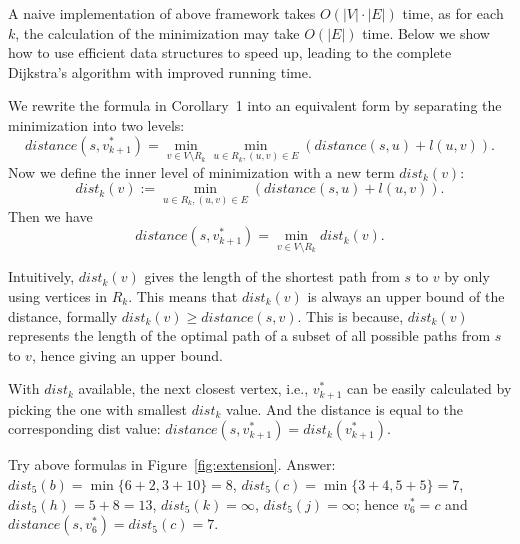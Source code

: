 \begin{algorithmblock}[0.8\textwidth]
	\xxx
	\xxx
	\xxx
	\xxx
	\xxx
	\xxx
	\xxx
\end{algorithmblock}

A naive implementation of above framework takes $O(|V|\cdot|E|)$ time,
as for each $k$, the calculation of the minimization may take $O(|E|)$ time.
Below we show how to use efficient data structures to speed up,
leading to the complete Dijkstra's algorithm with improved running time.


We rewrite the formula in Corollary~1 into an equivalent form by separating the minimization into two levels:
$$distance(s, v_{k+1}^*) = \textstyle \min_{v\in V\setminus R_k} \min_{u\in R_k, (u, v)\in E} (distance(s, u) + l(u,v)).$$
Now we define the inner level of minimization with a new term $dist_k(v)$:
$$dist_k(v) := \textstyle \min_{u\in R_k, (u, v)\in E} (distance(s, u) + l(u,v)).$$
Then we have 
$$distance(s, v_{k+1}^*) = \textstyle \min_{v\in V\setminus R_k} dist_k(v).$$

Intuitively, $dist_k(v)$ gives the length of the shortest path from $s$ to $v$ by only using vertices in $R_k$.
This means that $dist_k(v)$ is always an upper bound of the distance, formally $dist_k(v) \ge distance(s,v)$.
This is because, $dist_k(v)$ represents the length of the optimal
path of a subset of all possible paths from $s$ to $v$, hence giving an upper bound.

With $dist_k$ available, the next closest vertex, i.e., $v_{k+1}^*$ can be easily calculated
by picking the one with smallest $dist_k$ value. And the distance is equal to the corresponding dist value:
$distance(s, v_{k+1}^*) = dist_k(v_{k+1}^*)$.

Try above formulas in Figure~\ref{fig:extension}.
Answer: $dist_5(b) = \min\{6 + 2, 3 + 10\} = 8$, $dist_5(c) = \min\{3 + 4,  5 + 5\} = 7$, $dist_5(h) = 5 + 8 = 13$, 
$dist_5(k) = \infty$, $dist_5(j) = \infty$;
hence $v_6^* = c$ and $distance(s,v_6^*) = dist_5(c) = 7$.



